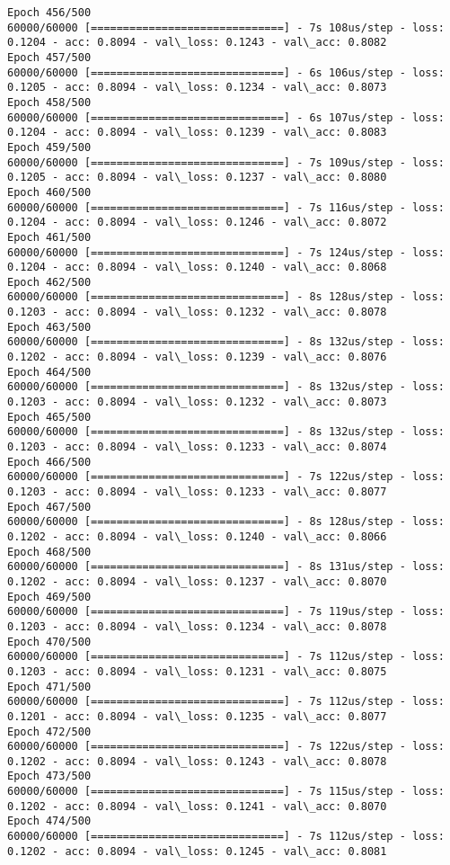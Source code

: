 \documentclass[11pt]{article}
\begin{document}
\begin{Verbatim}[commandchars=\\\{\}]
Epoch 456/500
60000/60000 [==============================] - 7s 108us/step - loss: 0.1204 - acc: 0.8094 - val\_loss: 0.1243 - val\_acc: 0.8082
Epoch 457/500
60000/60000 [==============================] - 6s 106us/step - loss: 0.1205 - acc: 0.8094 - val\_loss: 0.1234 - val\_acc: 0.8073
Epoch 458/500
60000/60000 [==============================] - 6s 107us/step - loss: 0.1204 - acc: 0.8094 - val\_loss: 0.1239 - val\_acc: 0.8083
Epoch 459/500
60000/60000 [==============================] - 7s 109us/step - loss: 0.1205 - acc: 0.8094 - val\_loss: 0.1237 - val\_acc: 0.8080
Epoch 460/500
60000/60000 [==============================] - 7s 116us/step - loss: 0.1204 - acc: 0.8094 - val\_loss: 0.1246 - val\_acc: 0.8072
Epoch 461/500
60000/60000 [==============================] - 7s 124us/step - loss: 0.1204 - acc: 0.8094 - val\_loss: 0.1240 - val\_acc: 0.8068
Epoch 462/500
60000/60000 [==============================] - 8s 128us/step - loss: 0.1203 - acc: 0.8094 - val\_loss: 0.1232 - val\_acc: 0.8078
Epoch 463/500
60000/60000 [==============================] - 8s 132us/step - loss: 0.1202 - acc: 0.8094 - val\_loss: 0.1239 - val\_acc: 0.8076
Epoch 464/500
60000/60000 [==============================] - 8s 132us/step - loss: 0.1203 - acc: 0.8094 - val\_loss: 0.1232 - val\_acc: 0.8073
Epoch 465/500
60000/60000 [==============================] - 8s 132us/step - loss: 0.1203 - acc: 0.8094 - val\_loss: 0.1233 - val\_acc: 0.8074
Epoch 466/500
60000/60000 [==============================] - 7s 122us/step - loss: 0.1203 - acc: 0.8094 - val\_loss: 0.1233 - val\_acc: 0.8077
Epoch 467/500
60000/60000 [==============================] - 8s 128us/step - loss: 0.1202 - acc: 0.8094 - val\_loss: 0.1240 - val\_acc: 0.8066
Epoch 468/500
60000/60000 [==============================] - 8s 131us/step - loss: 0.1202 - acc: 0.8094 - val\_loss: 0.1237 - val\_acc: 0.8070
Epoch 469/500
60000/60000 [==============================] - 7s 119us/step - loss: 0.1203 - acc: 0.8094 - val\_loss: 0.1234 - val\_acc: 0.8078
Epoch 470/500
60000/60000 [==============================] - 7s 112us/step - loss: 0.1203 - acc: 0.8094 - val\_loss: 0.1231 - val\_acc: 0.8075
Epoch 471/500
60000/60000 [==============================] - 7s 112us/step - loss: 0.1201 - acc: 0.8094 - val\_loss: 0.1235 - val\_acc: 0.8077
Epoch 472/500
60000/60000 [==============================] - 7s 122us/step - loss: 0.1202 - acc: 0.8094 - val\_loss: 0.1243 - val\_acc: 0.8078
Epoch 473/500
60000/60000 [==============================] - 7s 115us/step - loss: 0.1202 - acc: 0.8094 - val\_loss: 0.1241 - val\_acc: 0.8070
Epoch 474/500
60000/60000 [==============================] - 7s 112us/step - loss: 0.1202 - acc: 0.8094 - val\_loss: 0.1245 - val\_acc: 0.8081

\end{Verbatim}
\end{document}
